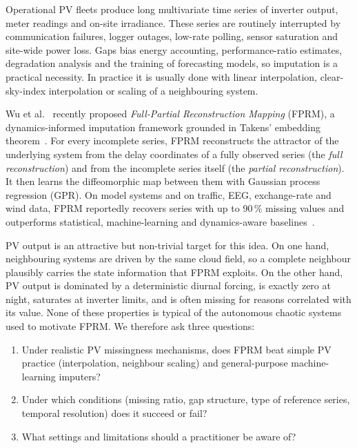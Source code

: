 \documentclass[11pt,a4paper]{article}
\newcommand{\pct}{\,\%}
\begin{document}
Operational PV fleets produce long multivariate time series of inverter output, meter readings and on-site irradiance.
These series are routinely interrupted by communication failures, logger outages, low-rate polling, sensor saturation and site-wide power loss.
Gaps bias energy accounting, performance-ratio estimates, degradation analysis and the training of forecasting models, so imputation is a practical necessity.
In practice it is usually done with linear interpolation, clear-sky-index interpolation or scaling of a neighbouring system.

Wu et al.~\cite{wu2026fprm} recently proposed \emph{Full-Partial Reconstruction Mapping} (FPRM), a dynamics-informed imputation framework grounded in Takens' embedding theorem~\cite{takens1981,deyle2011}.
For every incomplete series, FPRM reconstructs the attractor of the underlying system from the delay coordinates of a fully observed series (the \emph{full reconstruction}) and from the incomplete series itself (the \emph{partial reconstruction}).
It then learns the diffeomorphic map between them with Gaussian process regression (GPR).
On model systems and on traffic, EEG, exchange-rate and wind data, FPRM reportedly recovers series with up to 90\pct{} missing values and outperforms statistical, machine-learning and dynamics-aware baselines~\cite{wu2026fprm}.

PV output is an attractive but non-trivial target for this idea.
On one hand, neighbouring systems are driven by the same cloud field, so a complete neighbour plausibly carries the state information that FPRM exploits.
On the other hand, PV output is dominated by a deterministic diurnal forcing, is exactly zero at night, saturates at inverter limits, and is often missing for reasons correlated with its value.
None of these properties is typical of the autonomous chaotic systems used to motivate FPRM.
We therefore ask three questions:
\begin{enumerate}
  \item Under realistic PV missingness mechanisms, does FPRM beat simple PV practice (interpolation, neighbour scaling) and general-purpose machine-learning imputers?
  \item Under which conditions (missing ratio, gap structure, type of reference series, temporal resolution) does it succeed or fail?
  \item What settings and limitations should a practitioner be aware of?
\end{enumerate}
\end{document}
